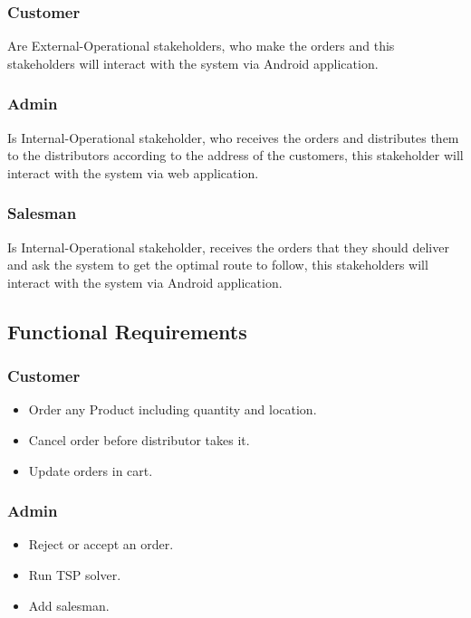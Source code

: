 \documentclass[12pt]{article}
\begin{document}
\subsubsection{  Customer }
Are External-Operational stakeholders, who make the orders and this stakeholders will interact with the system via Android application.

\subsubsection{  Admin }
Is Internal-Operational stakeholder, who receives the orders and distributes them to the distributors according to the address of the customers, this stakeholder will interact with the system via web application.

\subsubsection{  Salesman }
Is Internal-Operational stakeholder, receives the orders that they should deliver and ask the system to get the optimal route to follow, this stakeholders will interact with the system via Android application.
\newpage

\subsection{ Functional Requirements }

\subsubsection{ Customer }
\begin{itemize}
	\item Order any Product including quantity and location.
	\item Cancel order before distributor takes it.
	\item Update orders in cart.
\end{itemize}

\subsubsection{ Admin }
\begin{itemize}
	\item Reject or accept an order.
	\item Run TSP solver.
	\item Add salesman.
\end{itemize}
\end{document}
